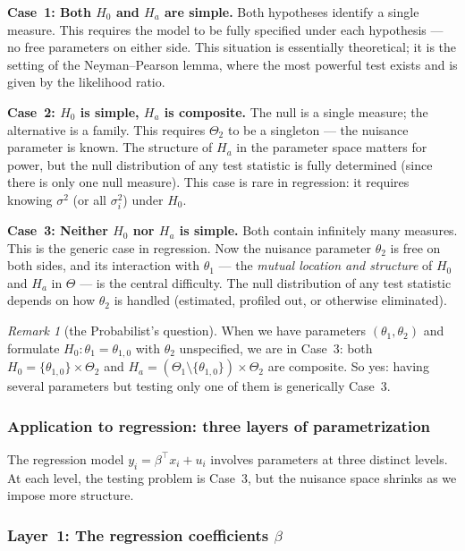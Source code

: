 \documentclass[a4paper,oneside,12pt]{extarticle}
\theoremstyle{plain}
\theoremstyle{definition}
\theoremstyle{remark}
\newtheorem{remark}[proposition]{Remark}
\begin{document}
\textbf{Case~1: Both $H_0$ and $H_a$ are simple.}
Both hypotheses identify a single measure.  This requires the
model to be fully specified under each hypothesis — no free
parameters on either side.  This situation is essentially
theoretical; it is the setting of the Neyman--Pearson lemma,
where the most powerful test exists and is given by the
likelihood ratio.

\textbf{Case~2: $H_0$ is simple, $H_a$ is composite.}
The null is a single measure; the alternative is a family.
This requires $\Theta_2$ to be a singleton — the nuisance
parameter is known.  The structure of $H_a$ in the parameter
space matters for power, but the null distribution of any
test statistic is fully determined (since there is only one
null measure).  This case is rare in regression: it requires
knowing $\sigma^2$ (or all $\sigma_i^2$) under $H_0$.

\textbf{Case~3: Neither $H_0$ nor $H_a$ is simple.}
Both contain infinitely many measures.  This is the generic
case in regression.  Now the nuisance parameter $\theta_2$
is free on both sides, and its interaction with $\theta_1$
— the \emph{mutual location and structure} of $H_0$ and
$H_a$ in $\Theta$ — is the central difficulty.  The null
distribution of any test statistic depends on how $\theta_2$
is handled (estimated, profiled out, or otherwise eliminated).

\begin{remark}[the Probabilist's question]
When we have parameters $(\theta_1, \theta_2)$ and formulate
$H_0: \theta_1 = \theta_{1,0}$ with $\theta_2$ unspecified,
we are in Case~3: both $H_0 = \{\theta_{1,0}\} \times \Theta_2$
and $H_a = (\Theta_1 \setminus \{\theta_{1,0}\}) \times \Theta_2$
are composite.  So yes: having several parameters but testing
only one of them is generically Case~3.
\end{remark}

\subsubsection*{Application to regression: three layers of parametrization}

The regression model $y_i = \beta^\top x_i + u_i$ involves
parameters at three distinct levels.  At each level, the testing
problem is Case~3, but the nuisance space shrinks as we impose
more structure.

\subsubsection*{Layer~1: The regression coefficients $\beta$}
\end{document}
